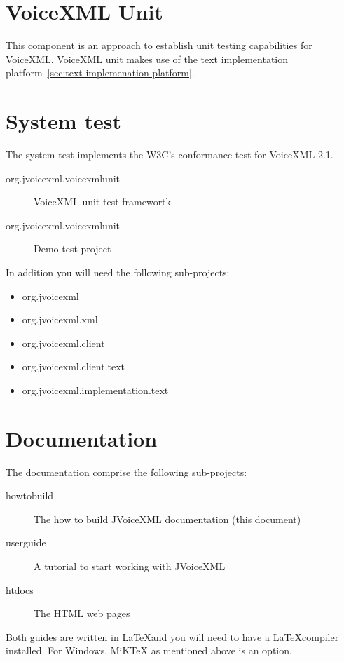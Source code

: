 \documentclass[11pt,a4paper]{article}
\begin{document}
\section{VoiceXML Unit}
\label{voicexml-unit}

This component is an approach to establish unit testing capabilities for
VoiceXML. VoiceXML unit makes use of the text implementation platform~\ref{sec:text-implemenation-platform}.

\section{System test}

The system test implements the W3C's conformance test for VoiceXML 2.1.

\begin{description}
\item[org.jvoicexml.voicexmlunit] VoiceXML unit test framewortk
\item[org.jvoicexml.voicexmlunit] Demo test project
\end{description}

In addition you will need the following sub-projects:
\begin{itemize}
\item org.jvoicexml
\item org.jvoicexml.xml
\item org.jvoicexml.client
\item org.jvoicexml.client.text
\item org.jvoicexml.implementation.text
\end{itemize} 

\section{Documentation}

The documentation comprise the following sub-projects:

\begin{description}
\item[howtobuild] The how to build JVoiceXML documentation (this document)
\item[userguide] A tutorial to start working with JVoiceXML
\item[htdocs] The HTML web pages
\end{description}

Both guides are written in \LaTeX and you will need to have a \LaTeX compiler
installed. For Windows, MiKTeX as mentioned above is an option.
\end{document}
